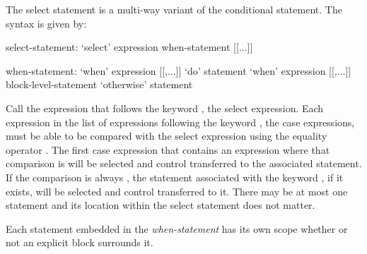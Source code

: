 
The select statement is a multi-way variant of the conditional
statement.  The syntax is given by:
\begin{syntax}
select-statement:
  `select' expression { when-statement [[...]] }

when-statement:
  `when' expression [[,...]] `do' statement
  `when' expression [[,...]] block-level-statement
  `otherwise' statement
\end{syntax}
Call the expression that follows the keyword , the select
expression.  Each expression in the list of expressions following the
keyword , the case expressions, must be able to be compared
with the select expression using the equality operator \chpl{==}.  The
first case expression that contains an expression where that
comparison is  will be selected and control transferred to
the associated statement.  If the comparison is always ,
the statement associated with the keyword , if it
exists, will be selected and control transferred to it.  There may be
at most one  statement and its location within the
select statement does not matter.

Each statement embedded in the {\em when-statement} has its own scope
whether or not an explicit block surrounds it.
